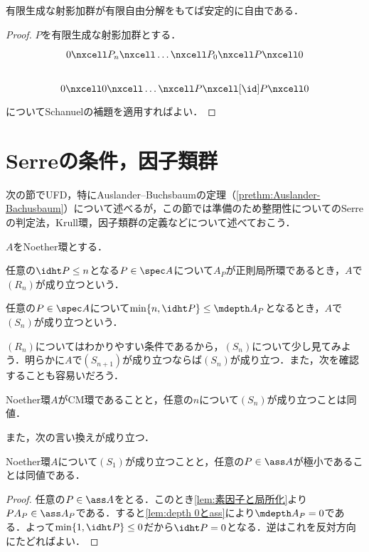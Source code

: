 \begin{prop}
	有限生成な射影加群が有限自由分解をもてば安定的に自由である．
\end{prop}

\begin{proof}
	$P$を有限生成な射影加群とする．
	\[\begin{tikzcd}
		0\nxcell P_n\nxcell\dots\nxcell P_0\nxcell P\nxcell0\\
		0\nxcell 0\nxcell\dots\nxcell P\nxcell[\id] P\nxcell0
	\end{tikzcd}\]	
	についてSchanuelの補題を適用すればよい．
\end{proof}


\section{Serreの条件，因子類群}

次の節でUFD，特にAuslander--Buchsbaumの定理（\ref{prethm:Auslander-Bachusbaum}）について述べるが，この節では準備のため整閉性についてのSerreの判定法，Krull環，因子類群の定義などについて述べておこう．

\begin{defi}[Serreの条件]
	$A$をNoether環とする．
	\begin{sakura}
		\item 任意の$\idht P\leq n$となる$P\in\spec A$について$A_P$が正則局所環であるとき，$A$で$(R_n)$が成り立つという．
		\item 任意の$P\in\spec A$について$\min\{n,\idht P\}\leq\mdepth A_P$となるとき，$A$で$(S_n)$が成り立つという．
	\end{sakura}
\end{defi}

$(R_n)$についてはわかりやすい条件であるから，$(S_n)$について少し見てみよう．明らかに$A$で$(S_{n+1})$が成り立つならば$(S_n)$が成り立つ．また，次を確認することも容易いだろう．

\begin{prop}
	Noether環$A$がCM環であることと，任意の$n$について$(S_n)$が成り立つことは同値．
\end{prop}

また，次の言い換えが成り立つ．
\begin{lem}
	Noether環$A$について$(S_1)$が成り立つことと，任意の$P\in\ass A$が極小であることは同値である．
\end{lem}

\begin{proof}
	任意の$P\in\ass A$をとる．このとき\ref{lem:素因子と局所化}より$PA_P\in\ass A_P$である．すると\ref{lem:depth 0とass}により$\mdepth A_P=0$である．よって$\min\{1,\idht P\}\leq0$だから$\idht P=0$となる．逆はこれを反対方向にたどればよい．
\end{proof}

